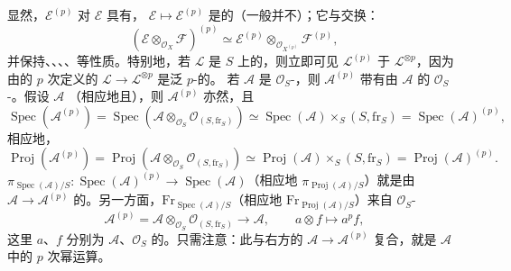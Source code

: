 显然，$\mathcal E^{(p)}$ 对 $\mathcal E$ 具有， $\mathcal E\mapsto\mathcal E^{(p)}$ 是的（一般并不）；它与交换：
\[
(\mathcal E\otimes_{\mathcal O_X}\mathcal F)^{(p)}
\simeq\mathcal E^{(p)}\otimes_{\mathcal O_{X^{(p)}}}\mathcal F^{(p)},
\]
并保持、、、、等性质。特别地，若 $\mathcal L$ 是 $S$ 上的，则立即可见 $\mathcal L^{(p)}$ 于 $\mathcal L^{\otimes p}$，因为由的 $p$ 次定义的 $\mathcal L\to\mathcal L^{\otimes p}$ 是泛 $p$-的。
若 $\mathcal A$ 是 $\mathcal O_S$-，则 $\mathcal A^{(p)}$ 带有由 $\mathcal A$ 的 $\mathcal O_S$-。假设 $\mathcal A$ （相应地且），则 $\mathcal A^{(p)}$ 亦然，且
\[
\operatorname{Spec}(\mathcal A^{(p)})
=\operatorname{Spec}(\mathcal A\otimes_{\mathcal O_S}\mathcal O_{(S,\mathrm{fr}_S)})
\simeq\operatorname{Spec}(\mathcal A)\times_S(S,\mathrm{fr}_S)
=\operatorname{Spec}(\mathcal A)^{(p)},
\]
相应地，
\[
\operatorname{Proj}(\mathcal A^{(p)})
=\operatorname{Proj}(\mathcal A\otimes_{\mathcal O_S}\mathcal O_{(S,\mathrm{fr}_S)})
\simeq\operatorname{Proj}(\mathcal A)\times_S(S,\mathrm{fr}_S)
=\operatorname{Proj}(\mathcal A)^{(p)}.
\]
 $\pi_{\operatorname{Spec}(\mathcal A)/S}:\operatorname{Spec}(\mathcal A)^{(p)}\to\operatorname{Spec}(\mathcal A)$（相应地 $\pi_{\operatorname{Proj}(\mathcal A)/S}$）就是由 $\mathcal A\to\mathcal A^{(p)}$ 的。另一方面，$\mathrm{Fr}_{\operatorname{Spec}(\mathcal A)/S}$（相应地 $\mathrm{Fr}_{\operatorname{Proj}(\mathcal A)/S}$）来自 $\mathcal O_S$-
\[
\mathcal A^{(p)}=\mathcal A\otimes_{\mathcal O_S}\mathcal O_{(S,\mathrm{fr}_S)}\longrightarrow\mathcal A,
\qquad a\otimes f\longmapsto a^pf,
\]
这里 $a$、$f$ 分别为 $\mathcal A$、$\mathcal O_S$ 的。只需注意：此与右方的 $\mathcal A\to\mathcal A^{(p)}$ 复合，就是 $\mathcal A$ 中的 $p$ 次幂运算。

